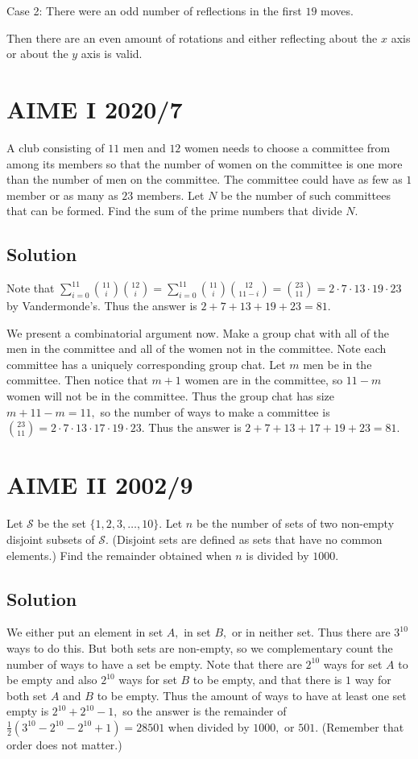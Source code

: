 \documentclass[blue,onecol]{shooting}
\begin{document}
Case 2: There were an odd number of reflections in the first $19$ moves.

Then there are an even amount of rotations and either reflecting about the $x$ axis or about the $y$ axis is valid.

\section{AIME I 2020/7}
A club consisting of $11$ men and $12$ women needs to choose a committee from among its members so that the number of women on the committee is one more than the number of men on the committee. The committee could have as few as $1$ member or as many as $23$ members. Let $N$ be the number of such committees that can be formed. Find the sum of the prime numbers that divide $N.$

\subsection{Solution}
Note that $\sum_{i=0}^{11}\binom{11}{i}\binom{12}{i}=\sum_{i=0}^{11}\binom{11}{i}\binom{12}{11-i}=\binom{23}{11}=2\cdot 7\cdot 13\cdot 19\cdot 23$ by Vandermonde's. Thus the answer is $2+7+13+19+23=81.$
    
We present a combinatorial argument now. Make a group chat with all of the men in the committee and all of the women not in the committee. Note each committee has a uniquely corresponding group chat. Let $m$ men be in the committee. Then notice that $m+1$ women are in the committee, so $11-m$ women will not be in the committee. Thus the group chat has size $m+11-m=11,$ so the number of ways to make a committee is $\binom{23}{11}=2\cdot 7\cdot 13\cdot 17\cdot 19\cdot 23.$ Thus the answer is $2+7+13+17+19+23=81.$

\section{AIME II 2002/9}
Let $\mathcal{S}$ be the set $\lbrace1,2,3,\ldots,10\rbrace.$ Let $n$ be the number of sets of two non-empty disjoint subsets of $\mathcal{S}$. (Disjoint sets are defined as sets that have no common elements.) Find the remainder obtained when $n$ is divided by $1000$.

\subsection{Solution}
We either put an element in set $A,$ in set $B,$ or in neither set. Thus there are $3^{10}$ ways to do this. But both sets are non-empty, so we complementary count the number of ways to have a set be empty. Note that there are $2^{10}$ ways for set $A$ to be empty and also $2^{10}$ ways for set $B$ to be empty, and that there is $1$ way for both set $A$ and $B$ to be empty. Thus the amount of ways to have at least one set empty is $2^{10}+2^{10}-1,$ so the answer is the remainder of $\frac{1}{2}(3^{10}-2^{10}-2^{10}+1)=28501$ when divided by $1000,$ or $501.$ (Remember that order does not matter.)
\end{document}
